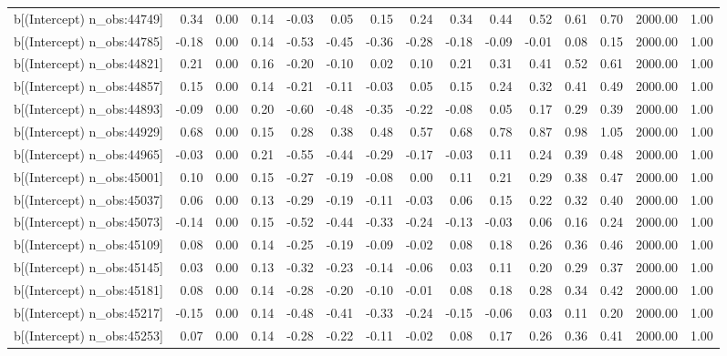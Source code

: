 \begin{table}[ht]
\begin{tabular}{rrrrrrrrrrrrrrr}
  b[(Intercept) n\_obs:44749] & 0.34 & 0.00 & 0.14 & -0.03 & 0.05 & 0.15 & 0.24 & 0.34 & 0.44 & 0.52 & 0.61 & 0.70 & 2000.00 & 1.00 \\ 
  b[(Intercept) n\_obs:44785] & -0.18 & 0.00 & 0.14 & -0.53 & -0.45 & -0.36 & -0.28 & -0.18 & -0.09 & -0.01 & 0.08 & 0.15 & 2000.00 & 1.00 \\ 
  b[(Intercept) n\_obs:44821] & 0.21 & 0.00 & 0.16 & -0.20 & -0.10 & 0.02 & 0.10 & 0.21 & 0.31 & 0.41 & 0.52 & 0.61 & 2000.00 & 1.00 \\ 
  b[(Intercept) n\_obs:44857] & 0.15 & 0.00 & 0.14 & -0.21 & -0.11 & -0.03 & 0.05 & 0.15 & 0.24 & 0.32 & 0.41 & 0.49 & 2000.00 & 1.00 \\ 
  b[(Intercept) n\_obs:44893] & -0.09 & 0.00 & 0.20 & -0.60 & -0.48 & -0.35 & -0.22 & -0.08 & 0.05 & 0.17 & 0.29 & 0.39 & 2000.00 & 1.00 \\ 
  b[(Intercept) n\_obs:44929] & 0.68 & 0.00 & 0.15 & 0.28 & 0.38 & 0.48 & 0.57 & 0.68 & 0.78 & 0.87 & 0.98 & 1.05 & 2000.00 & 1.00 \\ 
  b[(Intercept) n\_obs:44965] & -0.03 & 0.00 & 0.21 & -0.55 & -0.44 & -0.29 & -0.17 & -0.03 & 0.11 & 0.24 & 0.39 & 0.48 & 2000.00 & 1.00 \\ 
  b[(Intercept) n\_obs:45001] & 0.10 & 0.00 & 0.15 & -0.27 & -0.19 & -0.08 & 0.00 & 0.11 & 0.21 & 0.29 & 0.38 & 0.47 & 2000.00 & 1.00 \\ 
  b[(Intercept) n\_obs:45037] & 0.06 & 0.00 & 0.13 & -0.29 & -0.19 & -0.11 & -0.03 & 0.06 & 0.15 & 0.22 & 0.32 & 0.40 & 2000.00 & 1.00 \\ 
  b[(Intercept) n\_obs:45073] & -0.14 & 0.00 & 0.15 & -0.52 & -0.44 & -0.33 & -0.24 & -0.13 & -0.03 & 0.06 & 0.16 & 0.24 & 2000.00 & 1.00 \\ 
  b[(Intercept) n\_obs:45109] & 0.08 & 0.00 & 0.14 & -0.25 & -0.19 & -0.09 & -0.02 & 0.08 & 0.18 & 0.26 & 0.36 & 0.46 & 2000.00 & 1.00 \\ 
  b[(Intercept) n\_obs:45145] & 0.03 & 0.00 & 0.13 & -0.32 & -0.23 & -0.14 & -0.06 & 0.03 & 0.11 & 0.20 & 0.29 & 0.37 & 2000.00 & 1.00 \\ 
  b[(Intercept) n\_obs:45181] & 0.08 & 0.00 & 0.14 & -0.28 & -0.20 & -0.10 & -0.01 & 0.08 & 0.18 & 0.28 & 0.34 & 0.42 & 2000.00 & 1.00 \\ 
  b[(Intercept) n\_obs:45217] & -0.15 & 0.00 & 0.14 & -0.48 & -0.41 & -0.33 & -0.24 & -0.15 & -0.06 & 0.03 & 0.11 & 0.20 & 2000.00 & 1.00 \\ 
  b[(Intercept) n\_obs:45253] & 0.07 & 0.00 & 0.14 & -0.28 & -0.22 & -0.11 & -0.02 & 0.08 & 0.17 & 0.26 & 0.36 & 0.41 & 2000.00 & 1.00 \\ 

\end{tabular}
\end{table}

